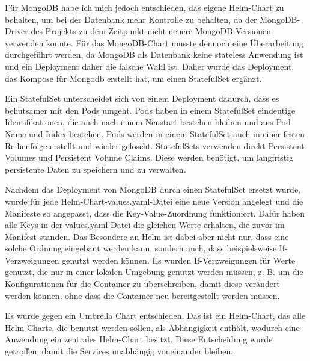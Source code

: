 Für MongoDB habe ich mich jedoch entschieden, das eigene Helm-Chart zu behalten, um bei der Datenbank mehr Kontrolle zu behalten, da der MongoDB-Driver des Projekts zu dem Zeitpunkt nicht neuere MongoDB-Versionen verwenden konnte.
Für das MongoDB-Chart musste dennoch eine Überarbeitung durchgeführt werden, da MongoDB als Datenbank keine stateless Anwendung ist und ein Deployment daher die falsche Wahl ist.
Daher wurde das Deployment, das Kompose für Mongodb erstellt hat, um einen StatefulSet ergänzt.

Ein StatefulSet unterscheidet sich von einem Deployment dadurch, dass es behutsamer mit den Pods umgeht. Pods haben in einem StatefulSet eindeutige Identifikationen, die auch nach einem Neustart bestehen bleiben und aus Pod-Name und Index bestehen.
Pods werden in einem StatefulSet auch in einer festen Reihenfolge erstellt und wieder gelöscht.
StatefulSets verwenden direkt Persistent Volumes und Persistent Volume Claims. Diese werden benötigt, um langfristig persistente Daten zu speichern und zu verwalten.

Nachdem das Deployment von MongoDB durch einen StatefulSet ersetzt wurde, wurde für jede Helm-Chart-values.yaml-Datei eine neue Version angelegt und die Manifeste so angepasst, dass die Key-Value-Zuordnung funktioniert. Dafür haben alle Keys in der values.yaml-Datei die gleichen Werte erhalten, die zuvor im Manifest standen.
Das Besondere an Helm ist dabei aber nicht nur, dass eine solche Ordnung eingebaut werden kann, sondern auch, dass beispielsweise If-Verzweigungen genutzt werden können. Es wurden If-Verzweigungen für Werte genutzt, die nur in einer lokalen Umgebung genutzt werden müssen, z. B. um die Konfigurationen für die Container zu überschreiben, damit diese verändert werden können, ohne dass die Container neu bereitgestellt werden müssen.

Es wurde gegen ein Umbrella Chart entschieden. Das ist ein Helm-Chart, das alle Helm-Charts, die benutzt werden sollen, als Abhängigkeit enthält, wodurch eine Anwendung ein zentrales Helm-Chart besitzt.
Diese Entscheidung wurde getroffen, damit die Services unabhängig voneinander bleiben.